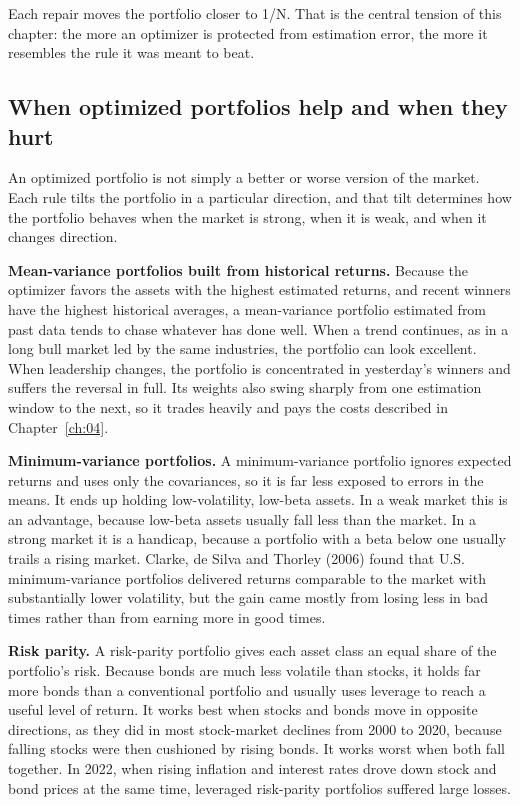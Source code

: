 Each repair moves the portfolio closer to 1/N. That is the central tension of this chapter: the more an optimizer is protected from estimation error, the more it resembles the rule it was meant to beat.

\subsection{When optimized portfolios help and when they hurt}
\label{sec:12-regimes}

An optimized portfolio is not simply a better or worse version of the market. Each rule tilts the portfolio in a particular direction, and that tilt determines how the portfolio behaves when the market is strong, when it is weak, and when it changes direction.

\textbf{Mean-variance portfolios built from historical returns.} Because the optimizer favors the assets with the highest estimated returns, and recent winners have the highest historical averages, a mean-variance portfolio estimated from past data tends to chase whatever has done well. When a trend continues, as in a long bull market led by the same industries, the portfolio can look excellent. When leadership changes, the portfolio is concentrated in yesterday's winners and suffers the reversal in full. Its weights also swing sharply from one estimation window to the next, so it trades heavily and pays the costs described in Chapter~\ref{ch:04}.

\textbf{Minimum-variance portfolios.} A minimum-variance portfolio ignores expected returns and uses only the covariances, so it is far less exposed to errors in the means. It ends up holding low-volatility, low-beta assets. In a weak market this is an advantage, because low-beta assets usually fall less than the market. In a strong market it is a handicap, because a portfolio with a beta below one usually trails a rising market. Clarke, de Silva and Thorley (2006) found that U.S. minimum-variance portfolios delivered returns comparable to the market with substantially lower volatility, but the gain came mostly from losing less in bad times rather than from earning more in good times.

\textbf{Risk parity.} A risk-parity portfolio gives each asset class an equal share of the portfolio's risk. Because bonds are much less volatile than stocks, it holds far more bonds than a conventional portfolio and usually uses leverage to reach a useful level of return. It works best when stocks and bonds move in opposite directions, as they did in most stock-market declines from 2000 to 2020, because falling stocks were then cushioned by rising bonds. It works worst when both fall together. In 2022, when rising inflation and interest rates drove down stock and bond prices at the same time, leveraged risk-parity portfolios suffered large losses.

